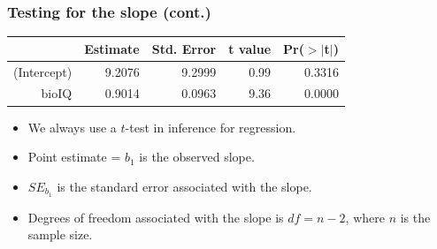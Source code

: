\documentclass[notes,11pt, aspectratio=169]{beamer}
\begin{document}

\begin{frame}
\frametitle{Testing for the slope (cont.)}

{\footnotesize
\begin{center}
\begin{tabular}{rrrrr}
  \hline
 & Estimate & Std. Error & t value & Pr($>$$|$t$|$) \\ 
  \hline
(Intercept) & 9.2076 & 9.2999 & 0.99 & 0.3316 \\ 
  bioIQ & 0.9014 & 0.0963 & 9.36 & 0.0000 \\ 
   \hline
\end{tabular}
\end{center}
}

\pause

\begin{itemize}

\item We always use a $t$-test in inference for regression. $\:$ \\

\pause


\pause

\item Point estimate = $b_1$ is the observed slope.

\pause

\item $SE_{b_1}$ is the standard error associated with the slope.

\pause

\item Degrees of freedom associated with the slope is $df = n - 2$, where $n$ is the sample size. $\:$ \\
\pause
{}

\end{itemize}

\end{frame}

\end{document}
